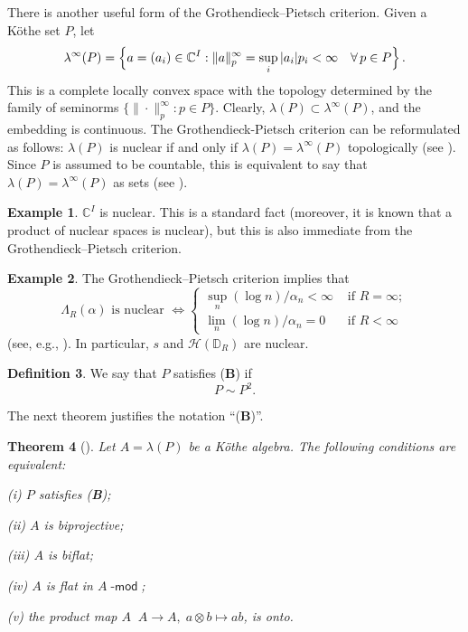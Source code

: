 \documentclass[12pt,reqno]{amsart}
\newtheorem{theorem}{Theorem}[section]
\theoremstyle{definition}
\newtheorem{definition}[theorem]{Definition}
\newtheorem{example}[theorem]{Example}
\begin{document}
There is another useful form of the Grothendieck--Pietsch criterion. Given a K\"othe set $P$,
let
\begin{equation*}
\lambda^\infty(P)=
\Bigl\{ a=(a_i)\in {\mathbb C}^I :
\| a\|_p^\infty=\sup_i |a_i|p_i <\infty\quad\forall\, p\in P\Bigr\}\, .
\end{equation*}
This is a complete locally convex space
with the topology determined by
the family of seminorms $\{\|\cdot\|_p^\infty : p\in P\}$.
Clearly, $\lambda(P)\subset\lambda^\infty(P)$, and the embedding is continuous.
The Grothendieck-Pietsch criterion can be reformulated as follows:
$\lambda(P)$ is nuclear if and only if
$\lambda(P)=\lambda^\infty(P)$ topologically (see \cite[6.1.3]{Pietsch}).
Since $P$ is assumed to be countable, this is equivalent to say that
$\lambda(P)=\lambda^\infty(P)$ as sets (see \cite[28.16]{MV}).

\begin{example}
${\mathbb C}^I$ is nuclear. This is a standard fact (moreover, it is known that
a product of nuclear spaces is nuclear), but this is also immediate from the
Grothendieck--Pietsch criterion.
\end{example}

\begin{example}
\label{example:Lambda_R_nucl}
The Grothendieck--Pietsch criterion implies that
\[
\Lambda_R(\alpha)\text{ is nuclear } \iff
\begin{cases}
\sup_n (\log n)/\alpha_n<\infty & \text{ if } R=\infty;\\
\lim_n (\log n)/\alpha_n=0 & \text{ if } R<\infty
\end{cases}
\]
(see, e.g., \cite[29.6 and 28.16]{MV}).
In particular, $s$ and ${\mathscr H}({\mathbb D}_R)$ are nuclear.
\end{example}

\begin{definition}
We say that $P$ satisfies ({\textbf{B}}) if
\begin{equation*}
P\sim P^2.
\end{equation*}
\end{definition}

The next theorem justifies the notation ``({\textbf{B}})''.

\begin{theorem}[{\cite[5.2]{Pir_msb}}]
\label{thm:kothe_bipr}
Let $A=\lambda(P)$ be a K\"othe algebra. The following conditions
are equivalent:
\begin{compactenum}
\item[{\upshape (i)}] $P$ satisfies {\upshape ({\textbf{B}})};
\item[{\upshape (ii)}] $A$ is biprojective;
\item[{\upshape (iii)}] $A$ is biflat;
\item[{\upshape (iv)}] $A$ is flat in $A{\mbox{-}\!\mathop{\mathsf{mod}}}$;
\item[{\upshape (v)}] the product map $A{\mathop{\widehat\otimes}} A\to A,\; a\otimes b\mapsto ab$, is onto.
\end{compactenum}
\end{theorem}
\end{document}
